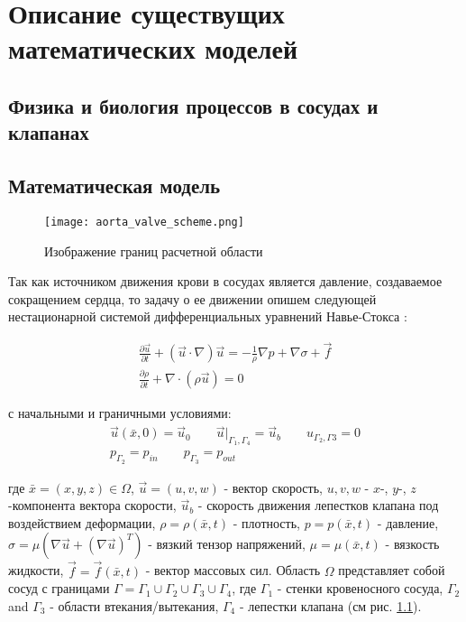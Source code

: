 \chapter{Описание существущих математических моделей} \label{chapt1}

\section{Физика и биология процессов в сосудах и клапанах} \label{sect1_1}

\section{Математическая модель} \label{sect1_2}

\begin{figure}[htbp]
\centering
\texttt{[image: aorta\_valve\_scheme.png]}
\caption{\label{fig:aorta_valve_scheme}Изображение границ расчетной
области}
\end{figure}

Так как источником движения крови в сосудах является давление,
создаваемое сокращением сердца, то задачу о ее движении опишем следующей
нестационарной системой дифференциальных уравнений Навье-Стокса
\cite{gummel2013motion}:

\begin{gather}
    \label{eq:navier_stokes:motion}
    \frac{\partial \vec{u}}{\partial t} + (\vec{u} \cdot \nabla) \vec{u} = - \frac{1}{\rho} \nabla p + \nabla \sigma + \vec{f}\\
    \label{eq:navier_stokes:continuity}
    \frac{\partial \rho}{\partial t} + \nabla \cdot (\rho \vec{u}) = 0 
\end{gather}

с начальными и граничными условиями:
\begin{gather}
    \label{eq:navier_stokes:velocity_conditions}
    \vec{u}(\bar{x}, 0) = \vec{u}_0 \qquad \vec{u}|_{\Gamma_1, \Gamma_4} = \vec{u}_b \qquad u_{\Gamma_2, \Gamma3} = 0\\
    \label{eq:navier_stokes:pressure_conditions}
    p_{\Gamma_2} = p_{in} \qquad p_{\Gamma_3} = p_{out}
\end{gather}

где \(\bar{x}=(x,y,z) \in \Omega\), \(\vec{u}=(u,v,w)\) - вектор
скорость, \(u, v, w\) - \(x\)-, \(y\)-, \(z\)-компонента вектора
скорости, \(\vec{u}_b\) - скорость движения лепестков клапана под
воздействием деформации, \(\rho=\rho(\bar{x}, t)\) - плотность,
\(p=p(\bar{x}, t)\) - давление,
\(\sigma = \mu (\nabla \vec{u} + (\nabla \vec{u})^T)\) - вязкий тензор
напряжений, \(\mu = \mu(\bar{x}, t)\) - вязкость жидкости,
\(\vec{f} = \vec{f}(\bar{x}, t)\) - вектор массовых сил. Область
\(\Omega\) представляет собой сосуд с границами
\(\Gamma = \Gamma_1 \cup \Gamma_2 \cup \Gamma_3 \cup \Gamma_4\), где
\(\Gamma_1\) - стенки кровеносного сосуда, \(\Gamma_2\) and \(\Gamma_3\)
- области втекания/вытекания, \(\Gamma_4\) - лепестки клапана (см рис.
\ref{fig:aorta_valve_scheme}).

